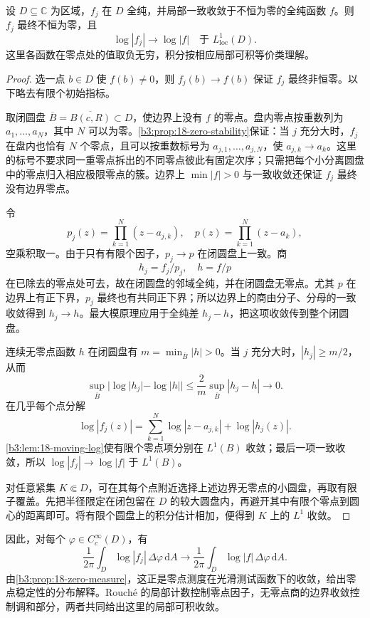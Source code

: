 \begin{theorem}[全纯对数模的局部可积稳定性]\label{b3:thm:18-log-modulus-stability}
设 \(D\subseteq\mathbb C\) 为区域，\(f_j\) 在 \(D\) 全纯，并局部一致收敛于不恒为零的全纯函数 \(f\)。则 \(f_j\) 最终不恒为零，且
\[
 \log|f_j|\longrightarrow\log|f|
 \quad\text{于 }L^1_{\mathrm{loc}}(D).
\]
这里各函数在零点处的值取负无穷，积分按相应局部可积等价类理解。
\end{theorem}
\begin{proof}
选一点 \(b\in D\) 使 \(f(b)\ne0\)，则 \(f_j(b)\to f(b)\) 保证 \(f_j\) 最终非恒零。以下略去有限个初始指标。

取闭圆盘 \(\overline B=\overline{B(c,R)}\subset D\)，使边界上没有 \(f\) 的零点。盘内零点按重数列为 \(a_1,\ldots,a_N\)，其中 \(N\) 可以为零。\cref{b3:prop:18-zero-stability}保证：当 \(j\) 充分大时，\(f_j\) 在盘内也恰有 \(N\) 个零点，且可以按重数标号为 \(a_{j,1},\ldots,a_{j,N}\)，使 \(a_{j,k}\to a_k\)。这里的标号不要求同一重零点拆出的不同零点彼此有固定次序；只需把每个小分离圆盘中的零点归入相应极限零点的簇。边界上 \(\min|f|>0\) 与一致收敛还保证 \(f_j\) 最终没有边界零点。

令
\[
 p_j(z)=\prod_{k=1}^N(z-a_{j,k}),
 \quad p(z)=\prod_{k=1}^N(z-a_k),
\]
空乘积取一。由于只有有限个因子，\(p_j\to p\) 在闭圆盘上一致。商
\[
 h_j=f_j/p_j,
 \quad h=f/p
\]
在已除去的零点处可去，故在闭圆盘的邻域全纯，并在闭圆盘无零点。尤其 \(p\) 在边界上有正下界，\(p_j\) 最终也有共同正下界；所以边界上的商由分子、分母的一致收敛得到 \(h_j\to h\)。最大模原理应用于全纯差 \(h_j-h\)，把这项收敛传到整个闭圆盘。

连续无零点函数 \(h\) 在闭圆盘有 \(m=\min_{\overline B}|h|>0\)。当 \(j\) 充分大时，\(|h_j|\ge m/2\)，从而
\[
 \sup_{\overline B}|\log|h_j|-\log|h||
 \le\frac2m\sup_{\overline B}|h_j-h|\longrightarrow0.
\]
在几乎每个点分解
\[
 \log|f_j(z)|=\sum_{k=1}^N\log|z-a_{j,k}|+\log|h_j(z)|.
\]
\cref{b3:lem:18-moving-log}使有限个零点项分别在 \(L^1(B)\) 收敛；最后一项一致收敛，所以 \(\log|f_j|\to\log|f|\) 于 \(L^1(B)\)。

对任意紧集 \(K\Subset D\)，可在其每个点附近选择上述边界无零点的小圆盘，再取有限子覆盖。先把半径限定在闭包留在 \(D\) 的较大圆盘内，再避开其中有限个零点到圆心的距离即可。将有限个圆盘上的积分估计相加，便得到 \(K\) 上的 \(L^1\) 收敛。
\end{proof}

因此，对每个 \(\varphi\in C_c^\infty(D)\)，有
\[
 \frac1{2\pi}\int_D\log|f_j|\,\Delta\varphi\,\mathrm dA
 \longrightarrow
 \frac1{2\pi}\int_D\log|f|\,\Delta\varphi\,\mathrm dA.
\]
由\cref{b3:prop:18-zero-measure}，这正是零点测度在光滑测试函数下的收敛，给出零点稳定性的分布解释。Rouch\'e 的局部计数控制零点因子，无零点商的边界收敛控制调和部分，两者共同给出这里的局部可积收敛。

